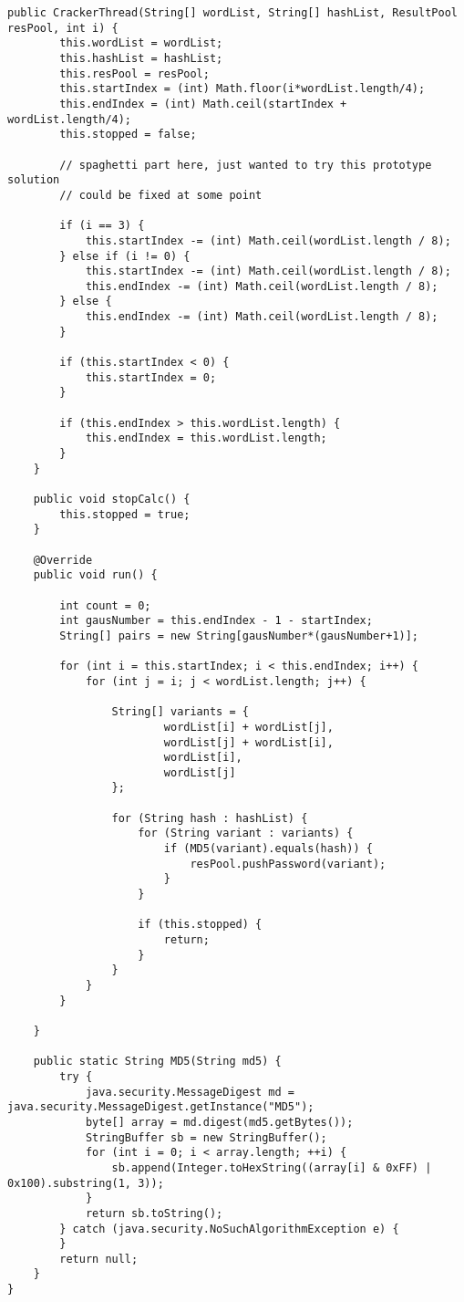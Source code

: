 \begin{enumerate}
\begin{lstlisting}[style=java]
    public CrackerThread(String[] wordList, String[] hashList, ResultPool resPool, int i) {
        this.wordList = wordList;
        this.hashList = hashList;
        this.resPool = resPool;
        this.startIndex = (int) Math.floor(i*wordList.length/4);
        this.endIndex = (int) Math.ceil(startIndex + wordList.length/4);
        this.stopped = false;

        // spaghetti part here, just wanted to try this prototype solution
        // could be fixed at some point

        if (i == 3) {
            this.startIndex -= (int) Math.ceil(wordList.length / 8);
        } else if (i != 0) {
            this.startIndex -= (int) Math.ceil(wordList.length / 8);
            this.endIndex -= (int) Math.ceil(wordList.length / 8);
        } else {
            this.endIndex -= (int) Math.ceil(wordList.length / 8);
        }

        if (this.startIndex < 0) {
            this.startIndex = 0;
        }

        if (this.endIndex > this.wordList.length) {
            this.endIndex = this.wordList.length;
        }
    }

    public void stopCalc() {
        this.stopped = true;
    }

    @Override
    public void run() {

        int count = 0;
        int gausNumber = this.endIndex - 1 - startIndex;
        String[] pairs = new String[gausNumber*(gausNumber+1)];

        for (int i = this.startIndex; i < this.endIndex; i++) {
            for (int j = i; j < wordList.length; j++) {

                String[] variants = {
                        wordList[i] + wordList[j],
                        wordList[j] + wordList[i],
                        wordList[i],
                        wordList[j]
                };

                for (String hash : hashList) {
                    for (String variant : variants) {
                        if (MD5(variant).equals(hash)) {
                            resPool.pushPassword(variant);
                        }
                    }

                    if (this.stopped) {
                        return;
                    }
                }
            }
        }

    }

    public static String MD5(String md5) {
        try {
            java.security.MessageDigest md = java.security.MessageDigest.getInstance("MD5");
            byte[] array = md.digest(md5.getBytes());
            StringBuffer sb = new StringBuffer();
            for (int i = 0; i < array.length; ++i) {
                sb.append(Integer.toHexString((array[i] & 0xFF) | 0x100).substring(1, 3));
            }
            return sb.toString();
        } catch (java.security.NoSuchAlgorithmException e) {
        }
        return null;
    }
}


\end{lstlisting}
\end{enumerate}
